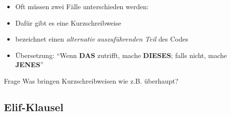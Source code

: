 

\begin{frame}
	\slidehead
	\begin{itemize}
		\item Oft müssen zwei Fälle unterschieden werden:
		\vspace{0.58cm}
		\item Dafür gibt es eine Kurzschreibweise
	\end{itemize}
\end{frame}

\begin{frame}
	\slidehead

	\begin{itemize}
		\item {} bezeichnet einen \textit{alternativ auszuführenden Teil} des Codes
		\item Übersetzung: "`Wenn \textbf{DAS} zutrifft, mache \textbf{DIESES}; falls nicht, mache \textbf{JENES}"'
	\end{itemize}

	\begin{block}{Frage}
		Was bringen Kurzschreibweisen wie z.B.  überhaupt?
	\end{block}
\end{frame}

\subsection{Elif-Klausel}

